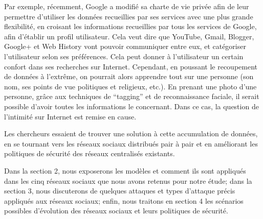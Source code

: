 Par exemple, récemment, Google a modifié sa charte de vie privée afin de leur
permettre d'utiliser les données recueillies par ses services avec une plus
grande flexibilité, en croisant les informations recueillies par tous les
services de Google, afin d'établir un profil utilisateur. \cite{spyw} Cela veut
dire que YouTube, Gmail, Blogger, Google+ et Web History vont pouvoir
communiquer entre eux, et catégoriser l'utilisateur selon ses préférences. Cela
peut donner à l'utilisateur un certain confort dans ses recherches sur
Internet. Cependant, en poussant le recoupement de données à l'extrême, on
pourrait alors apprendre tout sur une personne (son nom, ses points de vue
politiques et religieux, etc.). En prenant une photo d'une personne, grâce aux
techniques de ``tagging'' et de reconnaissance faciale, il serait possible d'avoir
toutes les informations le concernant. Dans ce cas, la question de l'intimité
sur Internet est remise en cause.

Les chercheurs essaient de trouver une solution à cette accumulation de
données, en se tournant vers les réseaux sociaux distribués pair à pair et en
améliorant les politiques de sécurité des réseaux centralisés existants.

Dans la section 2, nous exposerons les modèles et comment ils sont appliqués
dans les cinq réseaux sociaux que nous avons retenus pour notre étude; dans la
section 3, nous discuterons de quelques attaques et types d'attaque précis
appliqués aux réseaux sociaux; enfin, nous traitons en section 4 les scénarios
possibles d'évolution des réseaux sociaux et leurs politiques de sécurité.
